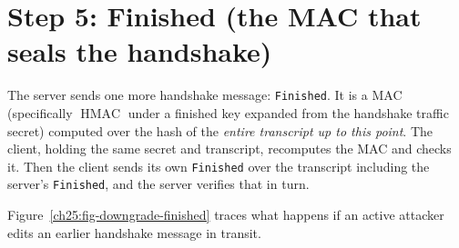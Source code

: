\section{Step 5: Finished (the MAC that seals the handshake)}

The server sends one more handshake message: \texttt{Finished}. It is a MAC
(specifically $\operatorname{HMAC}$ under a finished key expanded from the handshake
traffic secret) computed over the hash of the \emph{entire transcript up to this
point}. The client, holding the same secret and transcript, recomputes the MAC and
checks it. Then the client sends its own \texttt{Finished} over the transcript
including the server's \texttt{Finished}, and the server verifies that in turn.

Figure~\ref{ch25:fig-downgrade-finished} traces what happens if an active attacker
edits an earlier handshake message in transit.

